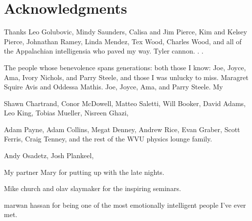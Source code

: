 
\chapter{Acknowledgments}
Thanks Leo Golubovic, Mindy Saunders, Calisa and Jim Pierce, Kim and Kelsey Pierce, Johnathan Ramey, Linda Mendez, Tex Wood, Charles Wood, and all of the Appalachian intelligensia who paved my way. Tyler cannon. . . 

The people whose benevolence spans generations: both those I know: Joe, Joyce, Ama, Ivory Nichols, and Parry Steele, and those I was unlucky to miss. Maragret  Squire Avis and Oddessa Mathis. Joe, Joyce, Ama, and Parry Steele. My 


Shawn Chartrand, Conor McDowell, Matteo Saletti, Will Booker, David Adams, Leo King, Tobias Mueller, Nisreen Ghazi, 

Adam Payne, Adam Collins, Megat Denney, Andrew Rice, Evan Graber, Scott Ferris, Craig Tenney, and the rest of the WVU physics lounge family.

Andy Osadetz, Josh Plankeel, 

My partner Mary for putting up with the late nights.

Mike church and olav slaymaker for the inspiring seminars.

marwan hassan for being one of the most emotionally intelligent people I've ever met.